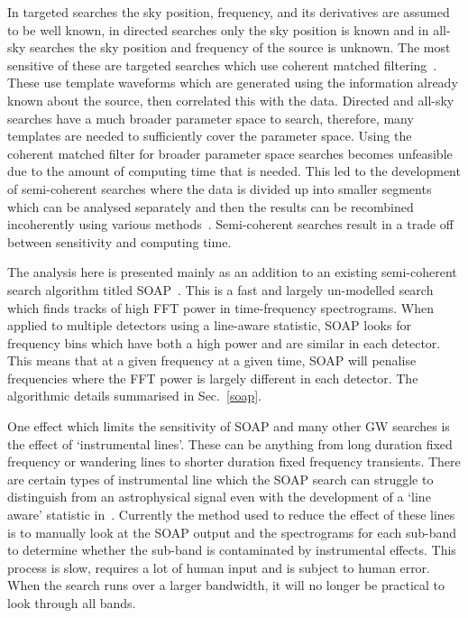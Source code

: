 %
In targeted searches the sky position, frequency, and its derivatives are
assumed to be well known, in directed searches only the sky position is
known and in all-sky searches the sky position and frequency of the source is unknown.
The most sensitive of these are targeted searches which use coherent matched
filtering~\cite{dupuis2005BayesianEstimation,schutz1998DataAnalysis}. These use
template waveforms which are generated using the information already known about the
source, then correlated this with the data. Directed and all-sky searches have
a much broader parameter space to search, therefore, many templates are needed
to sufficiently cover the parameter space. Using the coherent matched filter
for broader parameter space searches becomes unfeasible due to the amount of
computing time that is needed. This led to the development of semi-coherent
searches where the data is divided up into smaller segments which can be analysed
separately and then the results can be recombined incoherently using various
methods~\cite{abbott2019AllskySearch,creighton2000SearchingPeriodic}. Semi-coherent
searches result in a trade off between sensitivity and computing time.

%
The analysis here is presented mainly as an addition to an existing
semi-coherent search algorithm titled SOAP~\cite{bayley2019SOAPGeneralised}.
This is a fast and largely un-modelled search which finds tracks of
high \ac{FFT} power in time-frequency spectrograms. 
When applied to multiple detectors using a line-aware statistic, SOAP looks for frequency bins which have both a high power and are similar in each detector. 
This means that  at a given frequency at a given time, SOAP will penalise frequencies where the \ac{FFT} power is largely different in each detector.  
The algorithmic details summarised in Sec.~\ref{soap}. 

%

One effect which limits the sensitivity of SOAP and many other
\ac{GW} searches is the effect of `instrumental lines'.  These can be anything
from long duration fixed frequency or wandering lines to shorter duration fixed frequency transients. 
There are certain types of instrumental line which the SOAP search can struggle to distinguish from an astrophysical signal even with the development of a
`line aware' statistic in~\cite{bayley2019SOAPGeneralised}. Currently the
method used to reduce the effect of these lines is to manually look at the SOAP
output and the spectrograms for each sub-band to determine whether the sub-band
is contaminated by instrumental effects. This process is slow, requires a
lot of human input and is subject to human error. When the search runs over
a larger bandwidth, it will no longer be practical to look
through all bands. 

